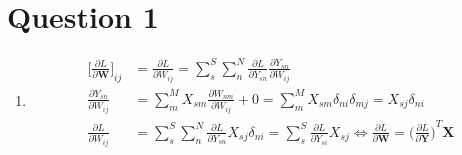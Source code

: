 \documentclass[11pt]{article}
\begin{document}
\section*{Question 1}
\begin{enumerate}[label=1\alph*]
\item
  \begin{align*}
    {\Big[\frac{\partial L}{\partial \mathbf{W}}\Big]}_{ij} &= \frac{\partial L}{\partial W_{ij}} =
                                                \sum_s^S \sum_n^N \frac{\partial L}{\partial
                                                Y_{sn}}\frac{\partial Y_{sn}}{\partial
                                                W_{ij}} \\
    \frac{\partial Y_{sn}}{\partial W_{ij}} &=
                                \sum_{m}^{M}X_{sm}\frac{\partial
                                W_{nm}}{\partial W_{ij}} + 0
                                =
                                \sum_{m}^{M}X_{sm}\delta_{ni}\delta_{mj}
                                = X_{sj}\delta_{ni} \\
    \frac{\partial L}{\partial W_{ij}} &= \sum_s^S \sum_n^N \frac{\partial
                           L}{\partial
                           Y_{sn}}X_{sj}\delta_{ni} =
                           \sum_s^S\frac{\partial
                           L}{\partial Y_{si}}X_{sj}
                           \Leftrightarrow \frac{\partial
                           L}{\partial \mathbf{W}} =
                           {\Big(\frac{\partial L}{\partial
                           \mathbf{Y}}\Big)}^T \mathbf{X}
  \end{align*}


\end{enumerate}
\end{document}
